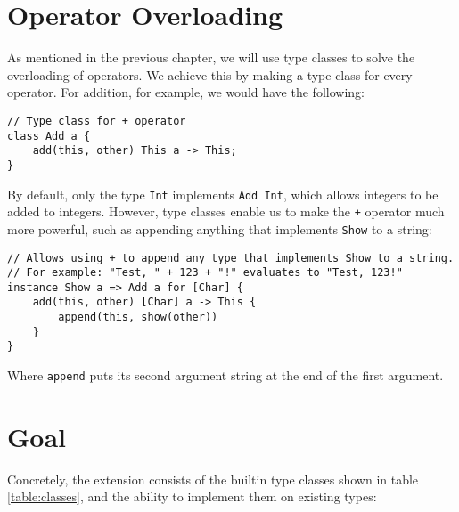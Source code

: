 \section{Operator Overloading}
As mentioned in the previous chapter, we will use type classes to solve the overloading of operators. We achieve this by making a type class for every operator. For addition, for example, we would have the following:

\begin{lstlisting}
// Type class for + operator
class Add a {
    add(this, other) This a -> This;
}
\end{lstlisting}

By default, only the type \lstinline|Int| implements \lstinline|Add Int|, which allows integers to be added to integers. However, type classes enable us to make the \lstinline|+| operator much more powerful, such as appending anything that implements \lstinline|Show| to a string:

\begin{lstlisting}
// Allows using + to append any type that implements Show to a string.
// For example: "Test, " + 123 + "!" evaluates to "Test, 123!"
instance Show a => Add a for [Char] {
    add(this, other) [Char] a -> This {
        append(this, show(other))
    }
}
\end{lstlisting}

Where \lstinline{append} puts its second argument string at the end of the first argument.

\section{Goal}
Concretely, the extension consists of the builtin type classes shown in table \ref{table:classes}, and the ability to implement them on existing types:

